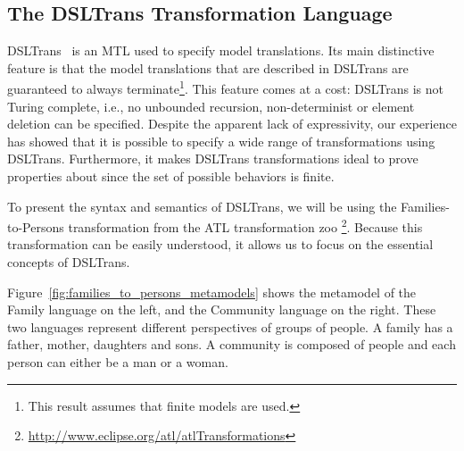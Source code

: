 

\subsection{The DSLTrans Transformation Language}

DSLTrans~\cite{Barroca2011} is an MTL used to specify model translations.
Its main distinctive feature is that the model translations that are described
in DSLTrans are guaranteed to always terminate\footnote{This result assumes that finite models are
used.}. This feature comes at a cost: DSLTrans is not Turing complete, i.e., no
unbounded recursion, non-determinist or
element deletion can be specified.
Despite the apparent lack of expressivity, our experience has showed that it is
possible to specify a wide range of transformations using DSLTrans. Furthermore,
it makes DSLTrans transformations ideal to prove properties about since the set
of possible behaviors is finite.

To present the syntax and semantics of DSLTrans, we will be using the Families-to-Persons transformation from the ATL transformation zoo \footnote{\url{http://www.eclipse.org/atl/atlTransformations}}.
Because this transformation can be easily understood, it allows us to focus on the essential concepts of DSLTrans.

Figure~\ref{fig:families_to_persons_metamodels} shows the metamodel of the Family language on the left, and the Community language on the right.
These two languages represent different perspectives of groups of people. A family has a father, mother, daughters and sons.
A community is composed of people and each person can either be a man or a woman.

